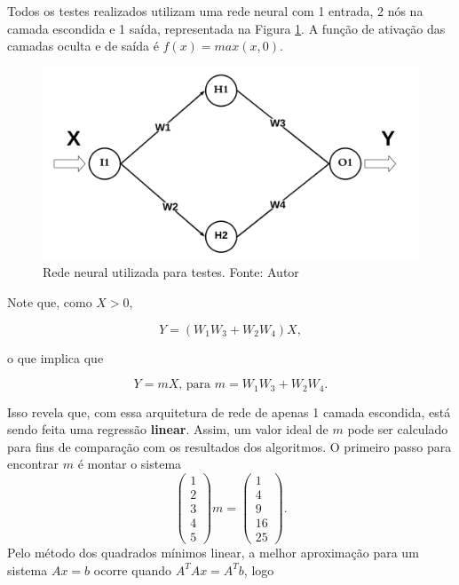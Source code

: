 \documentclass[a4paper,12pt]{article}
\begin{document}
Todos os testes realizados utilizam uma rede neural com  1 entrada, 2 nós na camada escondida e 1 saída, representada na Figura \ref{fig:1-2-1}. A função de ativação das camadas oculta e de saída é $f(x) = max(x,0).$\\

\begin{figure}[H]
\centering 
\includegraphics[scale=0.2]{Figuras/1-2-1.png}
\caption{Rede neural utilizada para testes. Fonte: Autor} 
\label{fig:1-2-1}
\end{figure} 

Note que, como $X > 0$,

$$Y = (W_1 W_3 + W_2 W_4 )X,$$

o que implica que

$$Y = m X \text{, para } m = W_1 W_3 + W_2 W_4 .$$

Isso revela que, com essa arquitetura de rede de apenas 1 camada escondida, está sendo feita uma regressão \textbf{linear}. Assim, um valor ideal de $m$ pode ser calculado para fins de comparação com os resultados dos algoritmos. O primeiro passo para encontrar $m$ é montar o sistema 
$$\begin{pmatrix} 1 \\ 2\\3\\4\\5
\end{pmatrix}m = \begin{pmatrix} 1 \\ 4\\9\\16\\25
\end{pmatrix}.
$$ 
Pelo método dos quadrados mínimos linear, a melhor aproximação para um sistema $Ax = b$ ocorre quando $A^TAx = A^Tb$, logo
\end{document}
